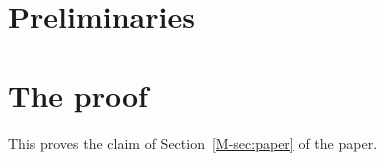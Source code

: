 \documentclass{article}
\begin{document}
\section{Preliminaries}
\section{The proof}\label{sec:proof}
This proves the claim of Section~\ref{M-sec:paper} of the paper.
\end{document}
